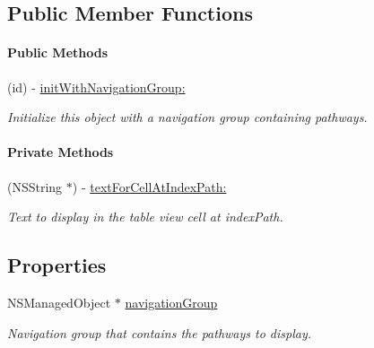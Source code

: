 \subsection*{Public Member Functions}
\begin{Indent}\paragraph*{Public Methods}
\begin{DoxyCompactItemize}
\item 
\hypertarget{interface_p_c_pathway_table_view_controller_a8f76010ba4db9641ee418744120ef987}{
(id) -\/ \hyperlink{interface_p_c_pathway_table_view_controller_a8f76010ba4db9641ee418744120ef987}{initWithNavigationGroup:}}
\label{interface_p_c_pathway_table_view_controller_a8f76010ba4db9641ee418744120ef987}

\begin{DoxyCompactList}\small\item\em Initialize this object with a navigation group containing pathways. \end{DoxyCompactList}\end{DoxyCompactItemize}
\end{Indent}
\begin{Indent}\paragraph*{Private Methods}
\begin{DoxyCompactItemize}
\item 
\hypertarget{interface_p_c_pathway_table_view_controller_acd282a87e2927fcbdcbd487f28c2012b}{
(NSString $\ast$) -\/ \hyperlink{interface_p_c_pathway_table_view_controller_acd282a87e2927fcbdcbd487f28c2012b}{textForCellAtIndexPath:}}
\label{interface_p_c_pathway_table_view_controller_acd282a87e2927fcbdcbd487f28c2012b}

\begin{DoxyCompactList}\small\item\em Text to display in the table view cell at indexPath. \end{DoxyCompactList}\end{DoxyCompactItemize}
\end{Indent}
\subsection*{Properties}
\begin{DoxyCompactItemize}
\item 
\hypertarget{interface_p_c_pathway_table_view_controller_a6a43f855e2a30d89d75a7b64be205f4a}{
NSManagedObject $\ast$ \hyperlink{interface_p_c_pathway_table_view_controller_a6a43f855e2a30d89d75a7b64be205f4a}{navigationGroup}}
\label{interface_p_c_pathway_table_view_controller_a6a43f855e2a30d89d75a7b64be205f4a}

\begin{DoxyCompactList}\small\item\em Navigation group that contains the pathways to display. \end{DoxyCompactList}\end{DoxyCompactItemize}


